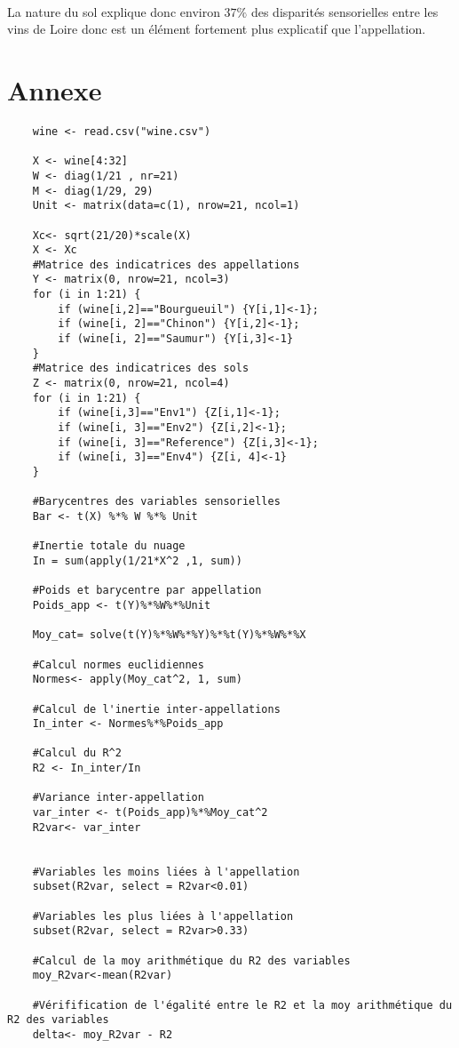 \documentclass[a4paper,10pt]{article}
\begin{document}
\
	
	
La nature du sol explique donc environ $37\%$ des disparités sensorielles entre les vins de Loire donc est un élément fortement plus explicatif que l'appellation. 
	
	
	
	
\section{Annexe}
	
\begin{verbatim}
	wine <- read.csv("wine.csv")
	
	X <- wine[4:32]
	W <- diag(1/21 , nr=21)
	M <- diag(1/29, 29)
	Unit <- matrix(data=c(1), nrow=21, ncol=1)
	
	Xc<- sqrt(21/20)*scale(X)
	X <- Xc
	#Matrice des indicatrices des appellations
	Y <- matrix(0, nrow=21, ncol=3)
	for (i in 1:21) {
		if (wine[i,2]=="Bourgueuil") {Y[i,1]<-1};
		if (wine[i, 2]=="Chinon") {Y[i,2]<-1};
		if (wine[i, 2]=="Saumur") {Y[i,3]<-1}
	}
	#Matrice des indicatrices des sols
	Z <- matrix(0, nrow=21, ncol=4)
	for (i in 1:21) {
		if (wine[i,3]=="Env1") {Z[i,1]<-1};
		if (wine[i, 3]=="Env2") {Z[i,2]<-1};
		if (wine[i, 3]=="Reference") {Z[i,3]<-1};
		if (wine[i, 3]=="Env4") {Z[i, 4]<-1}
	}
	
	#Barycentres des variables sensorielles
	Bar <- t(X) %*% W %*% Unit
	
	#Inertie totale du nuage
	In = sum(apply(1/21*X^2 ,1, sum))
	
	#Poids et barycentre par appellation 
	Poids_app <- t(Y)%*%W%*%Unit
	
	Moy_cat= solve(t(Y)%*%W%*%Y)%*%t(Y)%*%W%*%X
	
	#Calcul normes euclidiennes
	Normes<- apply(Moy_cat^2, 1, sum)
	
	#Calcul de l'inertie inter-appellations
	In_inter <- Normes%*%Poids_app
	
	#Calcul du R^2
	R2 <- In_inter/In
	
	#Variance inter-appellation
	var_inter <- t(Poids_app)%*%Moy_cat^2
	R2var<- var_inter
	
	
	#Variables les moins liées à l'appellation
	subset(R2var, select = R2var<0.01)
	
	#Variables les plus liées à l'appellation
	subset(R2var, select = R2var>0.33)
	
	#Calcul de la moy arithmétique du R2 des variables
	moy_R2var<-mean(R2var)
	
	#Vérifification de l'égalité entre le R2 et la moy arithmétique du R2 des variables
	delta<- moy_R2var - R2
	

\end{verbatim}
\end{document}
